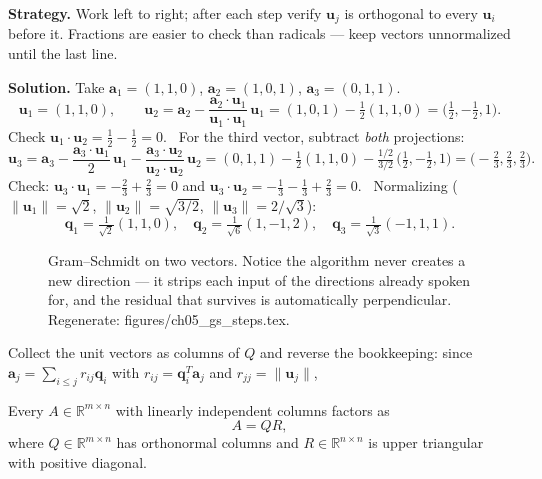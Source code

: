 \begin{example}\label{ex:gs}
\textbf{Strategy.} Work left to right; after each step verify
$\mathbf u_j$ is orthogonal to every $\mathbf u_i$ before it. Fractions are
easier to check than radicals --- keep vectors unnormalized until the last
line.

\textbf{Solution.} Take
$\mathbf a_1=(1,1,0)$, $\mathbf a_2=(1,0,1)$, $\mathbf a_3=(0,1,1)$.
\[
\mathbf u_1=(1,1,0),\qquad
\mathbf u_2=\mathbf a_2-\frac{\mathbf a_2\cdot\mathbf u_1}{\mathbf u_1\cdot\mathbf u_1}\,\mathbf u_1
=(1,0,1)-\tfrac12(1,1,0)=\bigl(\tfrac12,-\tfrac12,1\bigr).
\]
Check $\mathbf u_1\cdot\mathbf u_2=\tfrac12-\tfrac12=0$. \checkmark\ For the
third vector, subtract \emph{both} projections:
\[
\mathbf u_3=\mathbf a_3-\frac{\mathbf a_3\cdot\mathbf u_1}{2}\,\mathbf u_1
-\frac{\mathbf a_3\cdot\mathbf u_2}{\mathbf u_2\cdot\mathbf u_2}\,\mathbf u_2
=(0,1,1)-\tfrac12(1,1,0)-\tfrac{1/2}{3/2}\,\bigl(\tfrac12,-\tfrac12,1\bigr)
=\bigl(-\tfrac23,\tfrac23,\tfrac23\bigr).
\]
Check: $\mathbf u_3\cdot\mathbf u_1=-\tfrac23+\tfrac23=0$ and
$\mathbf u_3\cdot\mathbf u_2=-\tfrac13-\tfrac13+\tfrac23=0$. \checkmark\
Normalizing ($\|\mathbf u_1\|=\sqrt2$, $\|\mathbf u_2\|=\sqrt{3/2}$,
$\|\mathbf u_3\|=2/\sqrt3$):
\[
\mathbf q_1=\tfrac{1}{\sqrt2}(1,1,0),\quad
\mathbf q_2=\tfrac{1}{\sqrt6}(1,-1,2),\quad
\mathbf q_3=\tfrac{1}{\sqrt3}(-1,1,1).
\]
\end{example}

\begin{figure}[htbp]
\centering

\caption{Gram--Schmidt on two vectors. Notice the algorithm never creates a
new direction --- it strips each input of the directions already spoken
for, and the residual that survives is automatically perpendicular.
Regenerate: \ttfamily figures/ch05\_gs\_steps.tex.}
\label{fig:gs-steps}
\end{figure}

Collect the unit vectors as columns of $Q$ and reverse the bookkeeping:
since $\mathbf a_j=\sum_{i\le j}r_{ij}\mathbf q_i$ with
$r_{ij}=\mathbf q_i^{T}\mathbf a_j$ and $r_{jj}=\|\mathbf u_j\|$,

\begin{theorem}[QR factorization]
Every $A\in\mathbb R^{m\times n}$ with linearly independent columns factors
as
\[
A=QR,
\]
where $Q\in\mathbb R^{m\times n}$ has orthonormal columns and
$R\in\mathbb R^{n\times n}$ is upper triangular with positive diagonal.
\end{theorem}

